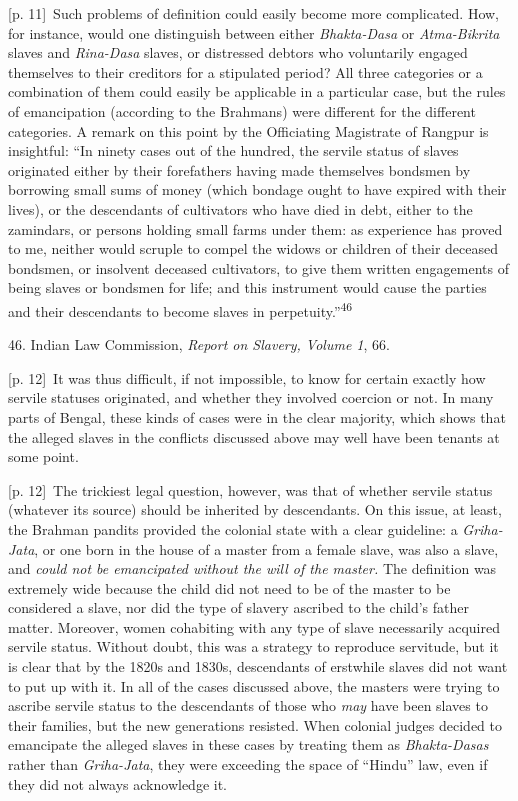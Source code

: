 \documentclass[10pt,a4paper]{article}
\begin{document}
{\scriptsize\color{gray} [p. 11]}\ Such problems of definition could easily become more complicated. How, for instance, would one distinguish between either \textit{Bhakta-Dasa} or \textit{Atma-Bikrita} slaves and \textit{Rina-Dasa} slaves, or distressed debtors who voluntarily engaged themselves to their creditors for a stipulated period? All three categories or a combination of them could easily be applicable in a particular case, but the rules of emancipation (according to the Brahmans) were different for the different categories. A remark on this point by the Officiating Magistrate of Rangpur is insightful: “In ninety cases out of the hundred, the servile status of slaves originated either by their forefathers having made themselves bondsmen by borrowing small sums of money (which bondage ought to have expired with their lives), or the descendants of cultivators who have died in debt, either to the zamindars, or persons holding small farms under them: as experience has proved to me, neither would scruple to compel the widows or children of their deceased bondsmen, or insolvent deceased cultivators, to give them written engagements of being slaves or bondsmen for life; and this instrument would cause the parties and their descendants to become slaves in perpetuity.”\nobreak\textsuperscript{46}\par{\small 46. Indian Law Commission, \textit{Report on Slavery, Volume 1}, 66.\par}
{\scriptsize\color{gray} [p. 12]}\ It was thus difficult, if not impossible, to know for certain exactly how servile statuses originated, and whether they involved coercion or not. In many parts of Bengal, these kinds of cases were in the clear majority, which shows that the alleged slaves in the conflicts discussed above may well have been tenants at some point.\par
{\scriptsize\color{gray} [p. 12]}\ The trickiest legal question, however, was that of whether servile status (whatever its source) should be inherited by descendants. On this issue, at least, the Brahman pandits provided the colonial state with a clear guideline: a \textit{Griha-Jata}, or one born in the house of a master from a female slave, was also a slave, and \textit{could not be emancipated without the will of the master.} The definition was extremely wide because the child did not need to be of the master to be considered a slave, nor did the type of slavery ascribed to the child’s father matter. Moreover, women cohabiting with any type of slave necessarily acquired servile status. Without doubt, this was a strategy to reproduce servitude, but it is clear that by the 1820s and 1830s, descendants of erstwhile slaves did not want to put up with it. In all of the cases discussed above, the masters were trying to ascribe servile status to the descendants of those who \textit{may} have been slaves to their families, but the new generations resisted. When colonial judges decided to emancipate the alleged slaves in these cases by treating them as \textit{Bhakta-Dasas} rather than \textit{Griha-Jata}, they were exceeding the space of “Hindu” law, even if they did not always acknowledge it.\par
\end{document}
